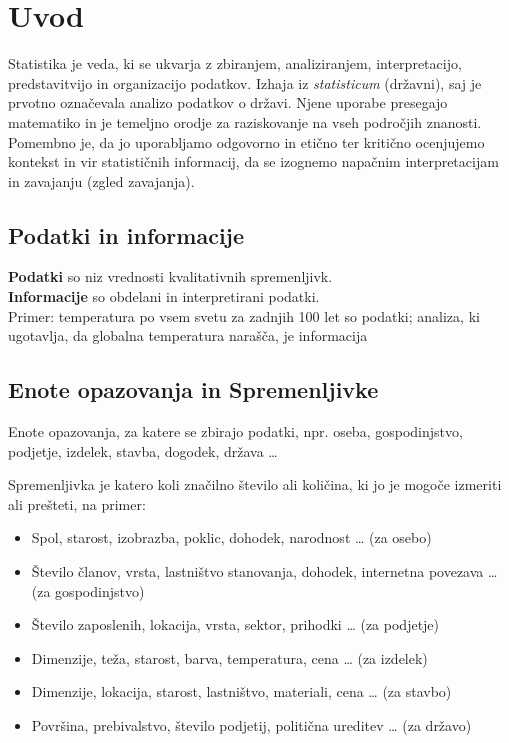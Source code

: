 \section{Uvod}

Statistika je veda, ki se ukvarja z zbiranjem, analiziranjem, interpretacijo, predstavitvijo in organizacijo podatkov. Izhaja iz \textit{statisticum} (državni), saj je prvotno označevala analizo podatkov o državi. Njene uporabe presegajo matematiko in je temeljno orodje za raziskovanje na vseh področjih znanosti. Pomembno je, da jo uporabljamo odgovorno in etično ter kritično ocenjujemo kontekst in vir statističnih informacij, da se izognemo napačnim interpretacijam in zavajanju (zgled zavajanja).


\subsection*{Podatki in informacije}

\textbf{Podatki} so niz vrednosti kvalitativnih spremenljivk.\\
\textbf{Informacije} so obdelani in interpretirani podatki.\\
Primer: temperatura po vsem svetu za zadnjih 100 let so podatki; analiza, ki ugotavlja, da globalna temperatura narašča, je informacija


\subsection*{Enote opazovanja in Spremenljivke}

Enote opazovanja, za katere se zbirajo podatki, npr. oseba, gospodinjstvo, podjetje, izdelek, stavba, dogodek, država …

Spremenljivka je katero koli značilno število ali količina, ki jo je mogoče izmeriti ali prešteti, na primer:
\begin{itemize}
\item Spol, starost, izobrazba, poklic, dohodek, narodnost … (za osebo)
\item Število članov, vrsta, lastništvo stanovanja, dohodek, internetna povezava … (za gospodinjstvo)
\item Število zaposlenih, lokacija, vrsta, sektor, prihodki … (za podjetje)
\item Dimenzije, teža, starost, barva, temperatura, cena … (za izdelek)
\item Dimenzije, lokacija, starost, lastništvo, materiali, cena … (za stavbo)
\item Površina, prebivalstvo, število podjetij, politična ureditev … (za državo)
\end{itemize}


